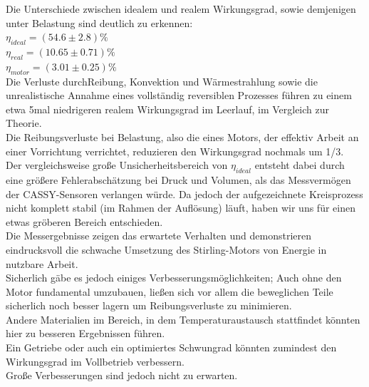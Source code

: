 \documentclass[12pt,a4paper]{article}
\begin{document}
\begin{multicols}{2}
Die Unterschiede zwischen idealem und realem Wirkungsgrad, sowie demjenigen unter Belastung sind deutlich zu erkennen:\\
$\eta_{ideal}=(54.6 \pm 2.8)\%$\\
$\eta_{real}=(10.65 \pm 0.71)\%$\\
$\eta_{motor}=(3.01\pm 0.25)\%$\\

\noindent Die Verluste durchReibung, Konvektion und Wärmestrahlung sowie die unrealistische Annahme eines vollständig reversiblen Prozesses führen zu einem etwa 5mal niedrigeren realem Wirkungsgrad im Leerlauf, im Vergleich zur Theorie.\\
Die Reibungsverluste bei Belastung, also die eines Motors, der effektiv Arbeit an einer Vorrichtung verrichtet, reduzieren den Wirkungsgrad nochmals um 1/3.\\

\noindent Der vergleichsweise große Unsicherheitsbereich von $\eta_{ideal}$ entsteht dabei durch eine größere Fehlerabschätzung bei Druck und Volumen, als das Messvermögen der CASSY-Sensoren verlangen würde. Da jedoch der aufgezeichnete Kreisprozess nicht komplett stabil (im Rahmen der Auflösung) läuft, haben wir uns für einen etwas gröberen Bereich entschieden.\\

\noindent Die Messergebnisse zeigen das erwartete Verhalten und demonstrieren eindrucksvoll die schwache Umsetzung des Stirling-Motors von Energie in nutzbare Arbeit.\\
Sicherlich gäbe es jedoch einiges Verbesserungsmöglichkeiten; Auch ohne den Motor fundamental umzubauen, ließen sich vor allem die beweglichen Teile sicherlich noch besser lagern um Reibungsverluste zu minimieren.\\
Andere Materialien im Bereich, in dem Temperaturaustausch stattfindet könnten hier zu besseren Ergebnissen führen.\\
Ein Getriebe oder auch ein optimiertes Schwungrad könnten zumindest den Wirkungsgrad im Vollbetrieb verbessern.\\
Große Verbesserungen sind jedoch nicht zu erwarten.\\


\end{multicols}
\end{document}

